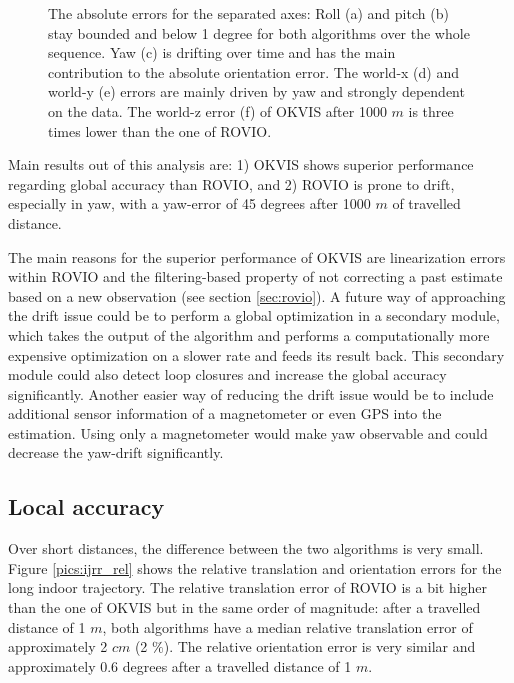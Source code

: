 \begin{figure}[h]
\begin{subfigure}[b]{0.48\textwidth}
    \caption{}
  \end{subfigure}
   \caption{The absolute errors for the separated axes: Roll (a) and pitch (b) stay bounded and below 1 degree for both algorithms over the whole sequence. Yaw (c) is drifting over time and has the main contribution to the absolute orientation error. The world-x (d) and world-y (e) errors are mainly driven by yaw and strongly dependent on the data. The world-z error (f) of OKVIS after 1000 $m$ is three times lower than the one of ROVIO.}
   \label{pics:ijrr_abs_separate}
\end{figure}

Main results out of this analysis are: 1) OKVIS shows superior performance regarding global accuracy than ROVIO, and 2) ROVIO is prone to drift, especially in yaw, with a yaw-error of 45 degrees after 1000 $m$ of travelled distance.

The main reasons for the superior performance of OKVIS are linearization errors within ROVIO and the filtering-based property of not correcting a past estimate based on a new observation (see section \ref{sec:rovio}). 
A future way of approaching the drift issue could be to perform a global optimization in a secondary module, which takes the output of the algorithm and performs a computationally more expensive optimization on a slower rate and feeds its result back. This secondary module could also detect loop closures and increase the global accuracy significantly. Another easier way of reducing the drift issue would be to include additional sensor information of a magnetometer or even GPS into the estimation. Using only a magnetometer would make yaw observable and could decrease the yaw-drift significantly.


\subsection{Local accuracy}
\label{sec:ijrr_local}

Over short distances, the difference between the two algorithms is very small. Figure \ref{pics:ijrr_rel} shows the relative translation and orientation errors for the long indoor trajectory. The relative translation error of ROVIO is a bit higher than the one of OKVIS but in the same order of magnitude: after a travelled distance of 1 $m$, both algorithms have a median relative translation error of approximately 2 $cm$ (2 $\%$). The relative orientation error is very similar and approximately 0.6 degrees after a travelled distance of 1 $m$. \\


